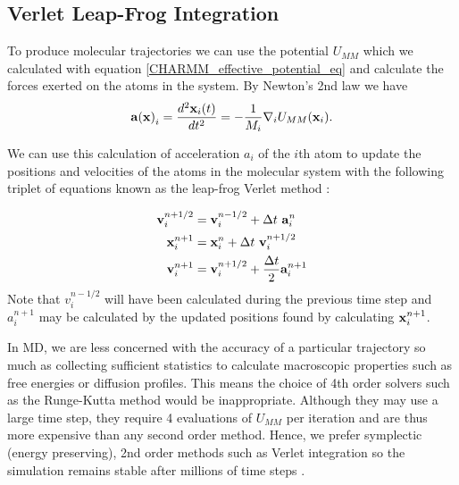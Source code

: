 \subsection{ Verlet Leap-Frog Integration}
To produce molecular trajectories we can use the potential $U_{MM}$ which we calculated with equation \ref{CHARMM_effective_potential_eq} and calculate the forces exerted on the atoms in the system.  By Newton's 2nd law we have 
\begin{equation}
	\bold{a(\bold{x})}_i = \frac{d^2 \bold{x}_i(t)}{dt^2} = - \frac{1}{M_i} \nabla_i U_{MM}(\bold{x}_i).
\end{equation}
 
We can use this calculation of acceleration $a_i$ of the $i$th atom to update the positions and velocities of the atoms in the molecular system with the following triplet of equations known as the leap-frog Verlet method \cite{schlick2010}:

\begin{equation} \label {leap-frog_equation}
	\begin{aligned}
		\bold{v}_i^{n+1/2} &= \bold{v}_i^{n-1/2} + \Delta t\  \bold{a}_i^n \\
		\bold{x}^{n+1}_i &= \bold{x}_i^{n} + \Delta t\  \bold{v}_i^{n+1/2}  \\
		\bold{v}^{n+1}_i &= \bold{v}_i^{n+1/2} + \frac{\Delta t} {2} \bold{a}_i^{n+1} \\
	\end{aligned}
 \end{equation}
 Note that $v_i^{n-1/2}$ will have  been calculated during the previous time step and $a_i^{n+1}$ may be  calculated by the updated positions found by calculating  $\bold{x}^{n+1}_i$.

 In MD, we are less concerned with the accuracy of a particular trajectory so much as collecting sufficient statistics to calculate macroscopic properties such as free energies or diffusion profiles. This means the choice of 4th order solvers such as the Runge-Kutta method would be inappropriate. Although they may use a large time step, they require 4 evaluations of $U_{MM}$ per iteration and are thus more expensive than any second order method. Hence, we prefer symplectic (energy preserving), 2nd order methods such as Verlet integration so the simulation remains stable after millions of time steps \cite{streett1978}. 

